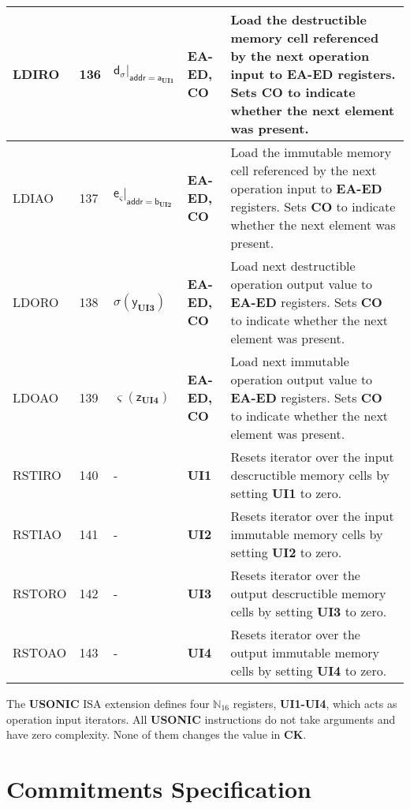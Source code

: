 \documentclass[9pt,oneside]{amsart}
\begin{document}
\begin{table}[h]
\begin{tabular}{l p{1cm} l p{1.5cm} p{9.3cm}}
LDIRO	&136	&$\mathsf{d}_\sigma|_{\mathsf{addr} = \mathsf{a}_\mathbf{UI1}}$	&\textbf{EA-ED, CO}	&Load the destructible memory cell referenced by the next operation input to \textbf{EA-ED} registers. Sets \textbf{CO} to indicate whether the next element was present. \\ \midrule
LDIAO	&137	&$\mathsf{e}_\varsigma|_{\mathsf{addr} = \mathsf{b}_\mathbf{UI2}}$	&\textbf{EA-ED, CO}	&Load the immutable memory cell referenced by the next operation input to \textbf{EA-ED} registers. Sets \textbf{CO} to indicate whether the next element was present. \\ \midrule
LDORO	&138	&$\sigma(\mathsf{y}_\mathbf{UI3})$	&\textbf{EA-ED, CO}	&Load next destructible operation output value to \textbf{EA-ED} registers. Sets \textbf{CO} to indicate whether the next element was present. \\ \midrule
LDOAO	&139	&$\varsigma(\mathsf{z}_\mathbf{UI4})$	&\textbf{EA-ED, CO}	&Load next immutable operation output value to \textbf{EA-ED} registers. Sets \textbf{CO} to indicate whether the next element was present. \\ \midrule
RSTIRO	&140	&-	&\textbf{UI1}	&Resets iterator over the input descructible memory cells by setting \textbf{UI1} to zero. \\ \midrule
RSTIAO	&141	&-	&\textbf{UI2}	&Resets iterator over the input immutable memory cells by setting \textbf{UI2} to zero. \\ \midrule
RSTORO	&142	&-	&\textbf{UI3}	&Resets iterator over the output descructible memory cells by setting \textbf{UI3} to zero. \\ \midrule
RSTOAO	&143	&-	&\textbf{UI4}	&Resets iterator over the output immutable memory cells by setting \textbf{UI4} to zero. \\
\bottomrule
\end{tabular}
\end{table}

The \textbf{USONIC} ISA extension defines four $\mathbb{N}_{16}$ registers, \textbf{UI1-UI4}, which acts as operation input iterators.
All \textbf{USONIC} instructions do not take arguments and have zero complexity. None of them changes the value in \textbf{CK}.


\newpage
\section{Commitments Specification}\label{AnnexB}

\newpage
\section{}\label{AnnexC}
\printglossaries
\end{document}
